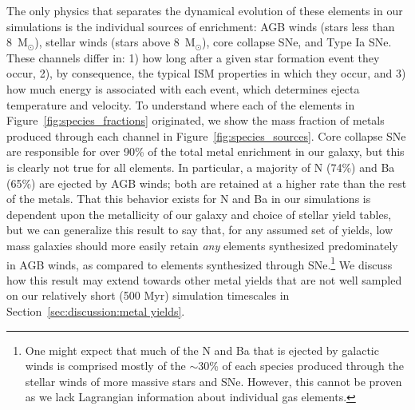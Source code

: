 The only physics that separates the dynamical evolution of these elements in our simulations is the individual sources of enrichment: AGB winds (stars less than 8~M$_{\odot}$), stellar winds (stars above 8~M$_{\odot}$), core collapse SNe, and Type Ia SNe. These channels differ in: 1) how long after a given star formation event they occur, 2), by consequence, the typical ISM properties in which they occur, and 3) how much energy is associated with each event, which determines ejecta temperature and velocity. To understand where each of the elements in Figure~\ref{fig:species_fractions} originated, we show the mass fraction of metals produced through each channel in Figure~\ref{fig:species_sources}. Core collapse SNe are responsible for over 90\% of the total metal enrichment in our galaxy, but this is clearly not true for all elements. In particular, a majority of N (74\%) and Ba (65\%) are ejected by AGB winds; both are retained at a higher rate than the rest of the metals. That this behavior exists for N and Ba in our simulations is dependent upon the metallicity of our galaxy and choice of stellar yield tables, but we can generalize this result to say that, for any assumed set of yields, low mass galaxies should more easily retain \textit{any} elements synthesized predominately in AGB winds, as compared to elements synthesized through SNe.\footnote{One might expect that much of the N and Ba that is ejected by galactic winds is comprised mostly of the $\sim$30\% of each species produced through the stellar winds of more massive stars and SNe. However, this cannot be proven as we lack Lagrangian information about individual gas elements.}
We discuss how this result may extend towards other metal yields that are not well sampled on our relatively short (500 Myr) simulation timescales in Section~\ref{sec:discussion:metal yields}.

